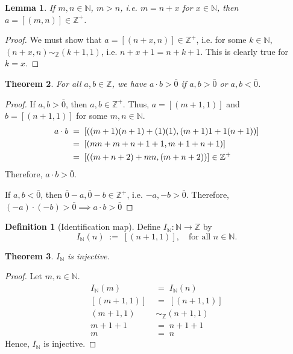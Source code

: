 \documentclass[10pt]{article}
\newtheorem{theorem}{Theorem}[section]
\newtheorem{lemma}[theorem]{Lemma}
\theoremstyle{definition}
\newtheorem*{definition}{Definition}
\theoremstyle{remark}
\newcommand{\N}{\mathbb{N}}
\newcommand{\Z}{\mathbb{Z}}
\newcommand{\simZ}{\sim_{\Z}}
\newcommand{\IdN}{I_{\N}}
\begin{document}
        \begin{lemma}
        \label{lem:Zplus}
                If $m, n \in \N$, $m > n$, i.e. $m = n + x$ for $x \in \N$,
                then $a = [(m, n)] \in \Z^+$.
        \end{lemma}
        \begin{proof}
                We must show that $a = [(n + x, n)] \in \Z^+$, i.e.
                for some $k \in \N$, $(n + x, n) \simZ (k + 1, 1)$, i.e.
                $n + x + 1 = n + k + 1$. This is clearly true for $k = x$.
        \end{proof}
        \begin{theorem}
                For all $a, b \in \Z$, we have $a\cdot b > \bar{0}$ if $a, b > \bar{0}$ or $a, b < \bar{0}$.
        \end{theorem}
        \begin{proof}
                If $a, b > \bar{0}$, then $a, b \in \Z^+$. Thus, $a = [(m + 1, 1)]$ and
                $b = [(n + 1, 1)]$ for some $m, n \in \N$.
                \begin{align*}
                        a\cdot b \;&=\; [((m + 1)(n + 1) + (1)(1), (m + 1)1 + 1(n + 1))] \\
                                \;&=\; [(mn + m + n + 1 + 1, m + 1 + n + 1)] \\
                                \;&=\; [((m + n + 2) + mn, (m + n + 2))] \in \Z^+ \qedhere
                \end{align*}
                Therefore, $a\cdot b > \bar{0}$.

                If $a, b < \bar{0}$, then $\bar{0} - a, \bar{0} - b \in \Z^+$, i.e.
                $-a, -b > \bar{0}$. Therefore, $(-a)\cdot(-b) > \bar{0} \implies a\cdot b > \bar{0}$
        \end{proof}

        \begin{definition}[Identification map]
                Define $\IdN\colon \N\to \Z$ by 
                \[
                        \IdN(n) \;:=\; [(n + 1, 1)],\quad\text{for all }n\in \N.
                \]
        \end{definition}

        \begin{theorem}
                $\IdN$ is injective.
        \end{theorem}
        \begin{proof}
                Let $m, n \in \N$.
                \begin{align*}
                        \IdN(m) \;&=\; \IdN(n) \\
                        [(m + 1, 1)] \;&=\; [(n + 1, 1)] \\
                        (m + 1, 1) &\simZ (n + 1, 1) \\
                        m + 1 + 1 \;&=\; n + 1 + 1 \\
                        m \;&=\; n
                \end{align*}
                Hence, $\IdN$ is injective.
        \end{proof}
\end{document}
